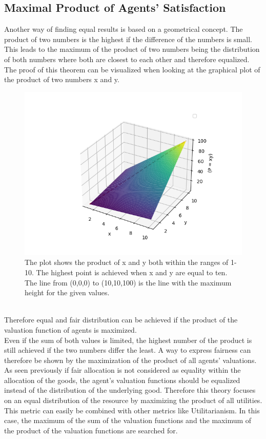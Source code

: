 \documentclass[german, a4paper, 11pt, oneside]{scrbook}
\begin{document}
 \subsection{Maximal Product of Agents' Satisfaction}
Another way of finding equal results is based on a geometrical concept. The product of two numbers is the highest if the difference of the numbers is small. This leads to the maximum of the product of two numbers being the distribution of both numbers where both are closest to each other and therefore equalized. \cite{Albrecht.2024} \\The proof of this theorem can be visualized when looking at the graphical plot of the product of two numbers x and y. 
\begin{figure}[h]
\centering
\includegraphics[width=1.0\textwidth]{x_times_y}
\caption{The plot shows the product of x and y both within the ranges of 1-10. The highest point is achieved when x and y are equal to ten. The line from (0,0,0) to (10,10,100) is the line with the maximum height for the given values.}
\end{figure}
\\Therefore equal and fair distribution can be achieved if the product of the valuation function of agents is maximized. \cite{Albrecht.2024}
\\Even if the sum of both values is limited, the highest number of the product is still achieved if the two numbers differ the least. A way to express fairness can therefore be shown by the maximization of the product of all agents' valuations. \\As seen previously if fair allocation is not considered as equality within the allocation of the goods, the agent's valuation functions should be equalized instead of the distribution of the underlying good. Therefore this theory focuses on an equal distribution of the resource by maximizing the product of all utilities. \\This metric can easily be combined with other metrics like Utilitarianism. In this case, the maximum of the sum of the valuation functions and the maximum of the product of the valuation functions are searched for. \cite{Albrecht.2024}
\end{document}
